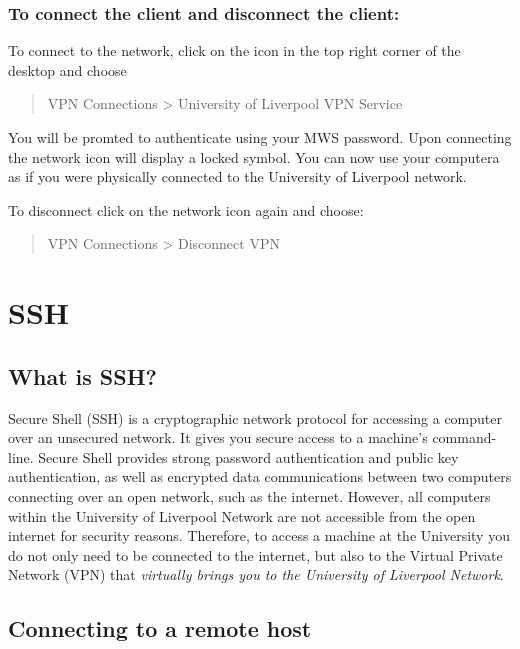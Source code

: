\documentclass[
]{book}
\begin{document}
\hypertarget{to-connect-the-client-and-disconnect-the-client}{%
\subsection{To connect the client and disconnect the client:}\label{to-connect-the-client-and-disconnect-the-client}}

To connect to the network, click on the icon in the top right corner of the desktop and choose

\begin{quote}
VPN Connections \textgreater{} University of Liverpool VPN Service
\end{quote}

You will be promted to authenticate using your MWS password. Upon connecting the network
icon will display a locked symbol. You can now use your computera as if you were physically
connected to the University of Liverpool network.

To disconnect click on the network icon again and choose:

\begin{quote}
VPN Connections \textgreater{} Disconnect VPN
\end{quote}

\hypertarget{ssh}{%
\chapter{SSH}\label{ssh}}

\hypertarget{what-is-ssh}{%
\section{What is SSH?}\label{what-is-ssh}}

Secure Shell (SSH) is a cryptographic network protocol for accessing a computer over an unsecured network. It gives you secure access to a machine's command-line.
Secure Shell provides strong password authentication and public key authentication, as well as encrypted data communications between two computers connecting over an open network, such as the internet. However, all computers within the University of Liverpool Network are not accessible from the open internet for security reasons.
Therefore, to access a machine at the University you do not only need to be connected to the internet, but also to the Virtual Private Network (VPN) that \emph{virtually brings you to the University of Liverpool Network}.

\hypertarget{connecting-to-a-remote-host}{%
\section{Connecting to a remote host}\label{connecting-to-a-remote-host}}
\end{document}
